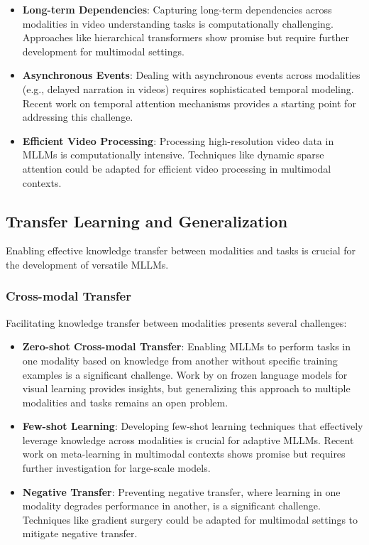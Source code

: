 \begin{itemize}
    \item \textbf{Long-term Dependencies}: Capturing long-term dependencies across modalities in video understanding tasks is computationally challenging. Approaches like hierarchical transformers \citep{liu2021video} show promise but require further development for multimodal settings.
    
    \item \textbf{Asynchronous Events}: Dealing with asynchronous events across modalities (e.g., delayed narration in videos) requires sophisticated temporal modeling. Recent work on temporal attention mechanisms \citep{zhou2018end} provides a starting point for addressing this challenge.
    
    \item \textbf{Efficient Video Processing}: Processing high-resolution video data in MLLMs is computationally intensive. Techniques like dynamic sparse attention \citep{child2019generating} could be adapted for efficient video processing in multimodal contexts.
\end{itemize}

\subsection{Transfer Learning and Generalization}
Enabling effective knowledge transfer between modalities and tasks is crucial for the development of versatile MLLMs.

\subsubsection{Cross-modal Transfer}
Facilitating knowledge transfer between modalities presents several challenges:

\begin{itemize}
    \item \textbf{Zero-shot Cross-modal Transfer}: Enabling MLLMs to perform tasks in one modality based on knowledge from another without specific training examples is a significant challenge. Work by \citet{tsimpoukelli2021multimodal} on frozen language models for visual learning provides insights, but generalizing this approach to multiple modalities and tasks remains an open problem.
    
    \item \textbf{Few-shot Learning}: Developing few-shot learning techniques that effectively leverage knowledge across modalities is crucial for adaptive MLLMs. Recent work on meta-learning in multimodal contexts \citep{pahde2021multimodal} shows promise but requires further investigation for large-scale models.
    
    \item \textbf{Negative Transfer}: Preventing negative transfer, where learning in one modality degrades performance in another, is a significant challenge. Techniques like gradient surgery \citep{yu2020gradient} could be adapted for multimodal settings to mitigate negative transfer.
\end{itemize}

